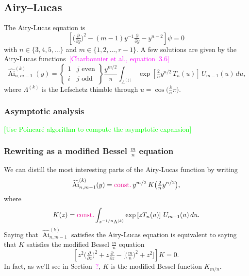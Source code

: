 \documentclass{article}
\DeclareMathOperator{\Ai}{Ai}
\begin{document}
\subsection{Airy--Lucas}
The Airy-Lucas equation is
\begin{equation}\label{eqn:airy-lucas}
\left[\big(\tfrac{\partial}{\partial y}\big)^2 - (m-1) y^{-1} \tfrac{\partial}{\partial y} - y^{n-2}\right] \psi = 0
\end{equation}
with $n \in \{3, 4, 5, \ldots\}$ and $m \in \{1, 2, \ldots, r-1\}$. A few solutions are given by the Airy-Lucas functions~\textcolor{magenta}{[Charbonnier et al., equation~3.6]}
\[ \widehat{\Ai}^{(k)}_{n, m-1}(y) = \left\{\begin{array}{ll}1 & j \text{ even} \\ i & j \text{ odd}\end{array}\right\} \frac{y^{m/2}}{\pi} \int_{\Lambda^{(j)}} \exp\left[\tfrac{2}{n} y^{n/2}\,T_n(u)\right]\,U_{m-1}(u)\,du, \]
where $\Lambda^{(k)}$ is the Lefschetz thimble through $u = \cos\big(\tfrac{k}{n}\pi\big)$.

\subsubsection{Asymptotic analysis}

\textcolor{lime}{[Use Poincar\'e algorithm to compute the asymptotic expansion]}

\subsubsection{Rewriting as a modified Bessel $\frac{m}{n}$ equation}
We can distill the most interesting parts of the Airy-Lucas function by writing
\[ \widehat{\Ai}^{(k)}_{n, m-1}(y) = \textcolor{magenta}{\text{const.}}\,y^{{m/2}}\,K\big(\tfrac{2}{n} y^{n/2}\big), \]
where
\begin{equation}\label{integral:mod-bessel-rational-AL}
K(z) = \textcolor{magenta}{\text{const.}} \int_{z^{-{1/n}}\Lambda^{(k)}} \exp\left[z T_n(u)\right]\,U_{m-1}(u)\,du.
\end{equation}
Saying that $\widehat{\Ai}^{(k)}_{n, m-1}$ satisfies the Airy-Lucas equation is equivalent to saying that $K$ satisfies the modified Bessel $\frac{m}{n}$ equation
\begin{equation}\label{eqn:mod-bessel-AL}
\left[z^2 \big(\tfrac{\partial}{\partial z}\big)^2 + z \tfrac{\partial}{\partial z} - \big[\big(\tfrac{m}{n} \big)^2 + z^2\big]\right] K = 0.
\end{equation}
In fact, as we'll see in Section~\textcolor{magenta}{?}, $K$ is the modified Bessel function $K_{{m/n}}$.
\end{document}
